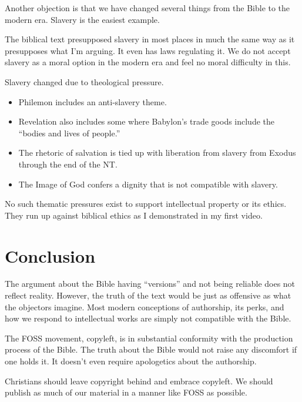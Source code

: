 \documentclass{beamer}
\begin{document}
\begin{frame}
  Another objection is that we have changed several things from the Bible to the modern era.
  Slavery is the easiest example.
\end{frame}

\begin{frame}
  The biblical text presupposed slavery in most places in much the same way as it presupposes what I'm arguing.
  It even has laws regulating it.
  We do not accept slavery as a moral option in the modern era and feel no moral difficulty in this.
\end{frame}

\begin{frame}
  Slavery changed due to theological pressure.\pause
  \begin{itemize}
	\item Philemon includes an anti-slavery theme.\pause
	\item Revelation also includes some where Babylon's trade goods include the ``bodies and lives of people.''\pause
	\item The rhetoric of salvation is tied up with liberation from slavery from Exodus through the end of the NT.\pause
	\item The Image of God confers a dignity that is not compatible with slavery.
  \end{itemize}
\end{frame}

\begin{frame}
  No such thematic pressures exist to support intellectual property or its ethics.
  They run up against biblical ethics as I demonstrated in my first video.
\end{frame}

\section{Conclusion}

\begin{frame}
  The argument about the Bible having ``versions'' and not being reliable does not reflect reality.
  However, the truth of the text would be just as offensive as what the objectors imagine.
  Most modern conceptions of authorship, its perks, and how we respond to intellectual works are simply not compatible with the Bible.
\end{frame}

\begin{frame}
  The FOSS movement, copyleft, is in substantial conformity with the production process of the Bible.
  The truth about the Bible would not raise any discomfort if one holds it.
  It doesn't even require apologetics about the authorship.
\end{frame}

\begin{frame}
  Christians should leave copyright behind and embrace copyleft.
  We should publish as much of our material in a manner like FOSS as possible.
\end{frame}
\end{document}
